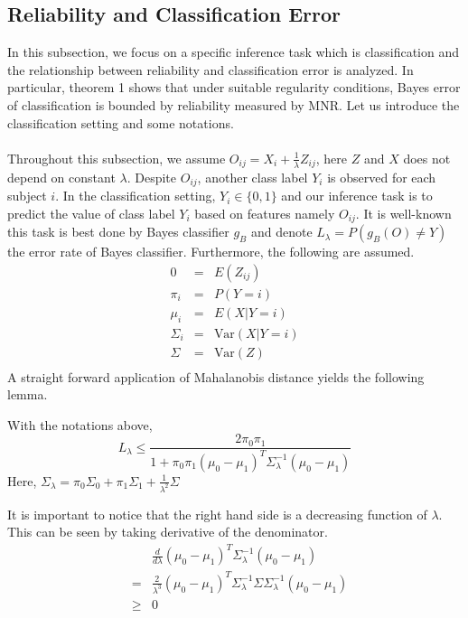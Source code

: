 \documentclass{article}
\begin{document}
\subsection{Reliability and Classification Error}

In this subsection, we focus on a specific inference task which is classification and the relationship between reliability and classification error is analyzed. In particular, theorem 1 shows that under suitable regularity conditions, Bayes error of classification is bounded by reliability measured by MNR. Let us introduce the classification setting and some notations. \\
\\
Throughout this subsection, we assume $O_{ij}=X_i+ \frac{1}{\lambda} Z_{ij}$, here $Z$ and $X$ does not depend on constant $\lambda$. Despite $O_{ij}$, another class label $Y_i$ is observed for each subject $i$. In the classification setting, $Y_i \in \{0,1\}$ and our inference task is to predict the value of class label $Y_i$ based on features namely $O_{ij}$. It is well-known this task is best done by Bayes classifier $g_B$ and denote $L_{\lambda}=P(g_B(O)\neq Y)$ the error rate of Bayes classifier. Furthermore, the following are assumed.
\begin{eqnarray*}
0&=& E(Z_{ij}) \\
\pi_i &=&P(Y=i) \\
\mu_i &=&E(X|Y=i)\\
\Sigma_i&=& \text{Var}(X|Y=i)  \\
\Sigma &=& \text{Var}(Z)  \\
\end{eqnarray*}
A straight forward application of Mahalanobis distance yields the following lemma.
\begin{lem} With the notations above,
\[L_\lambda \leq \frac{2\pi_0\pi_1}{1+\pi_0\pi_1(\mu_0-\mu_1)^T\Sigma_\lambda^{-1}(\mu_0-\mu_1)}\]
Here, $\Sigma_\lambda=\pi_0\Sigma_0+\pi_1\Sigma_1+\frac{1}{\lambda^2}\Sigma$ 
\end{lem}
\noindent It is important to notice that the right hand side is a decreasing function of $\lambda$. This can be seen by taking derivative of the denominator.
\begin{eqnarray*}
& &\frac{d}{d\lambda}(\mu_0-\mu_1)^T\Sigma_\lambda^{-1}(\mu_0-\mu_1) \\
&=&\frac{2}{\lambda^3}(\mu_0-\mu_1)^T\Sigma_\lambda^{-1}\Sigma\Sigma_\lambda^{-1}(\mu_0-\mu_1) \\
&\geq&  0
\end{eqnarray*}
\end{document}
